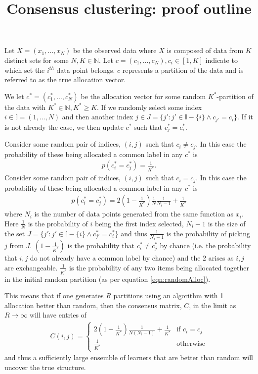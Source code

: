 \documentclass[]{article}
\title{Consensus clustering: proof outline}
\begin{document}
\maketitle

Let $X=(x_1, \ldots, x_N)$ be the observed data where $X$ is composed of data from $K$ distinct sets for some $N, K \in \mathbb{N}$. Let $c=(c_1, \ldots, c_N), c_i \in [1, K]$ indicate to which set the $i^{th}$ data point belongs. $c$ represents a partition of the data and is referred to as the true allocation vector.

We let $c^* = (c_1^*, \ldots,c_N^*)$ be the allocation vector for some random $K^*$-partition of the data with $K^* \in \mathbb{N}, K^* \geq K$. If we randomly select some index $i \in \mathbb{I}=(1, \ldots, N)$ and then another index $j \in J=\{j' : j' \in \mathbb{I} - \{i\} \wedge c_{j'}=c_i\}$. If it is not already the case, we then update $c^*$ such that $c_j^* = c_i^*$. 

Consider some random pair of indices, $(i,j)$ such that $c_i \neq c_j$. In this case the probability of these being allocated a common label in any $c^*$ is
\begin{align}
	p(c_i^* = c_j^*) = \frac{1}{K^*}.
	\label{eqn:randomAlloc}
\end{align}
Consider some random pair of indices, $(i,j)$ such that $c_i=c_j$. In this case the probability of these being allocated a common label in any $c^*$ is
\begin{align}
	p(c_i^* = c_j^*) = 2 \left(1 - \frac{1}{K^*}\right) \frac{1}{N}\frac{1}{N_i - 1} + \frac{1}{K^*}
\end{align}
where $N_i$ is the number of data points generated from the same function as $x_i$. Here $\frac{1}{N}$ is the probability of $i$ being the first index selected, $N_i - 1$ is the size of the set $J=\{j' : j' \in \mathbb{I} - \{i\} \wedge c_{j'}^*=c_i^*\}$ and thus $\frac{1}{N_i - 1}$ is the probability of picking $j$ from $J$. $(1 - \frac{1}{K^*})$ is the probability that $c_i^* \neq c_j^*$ by chance (i.e. the probability that $i,j$ do not already have a common label by chance) and the $2$ arises as $i,j$ are exchangeable. $\frac{1}{K^*}$ is the probability of any two items being allocated together in the initial random partition (as per equation \ref{eqn:randomAlloc}).

This means that if one generates $R$ partitions using an algorithm with 1 allocation better than random, then the consensus matrix, $C$, in the limit as $R \to \infty$ will have entries of 
\begin{align}
	C(i, j) = \begin{cases}
		2 (1 - \frac{1}{K^*}) \frac{1}{N(N_i - 1)} + \frac{1}{K^*} & \text{if $c_i = c_j$}\\
		\frac{1}{K^*} & \text{otherwise}
	\end{cases}       
\end{align}
and thus a sufficiently large ensemble of learners that are better than random will uncover the true structure.
\end{document}
